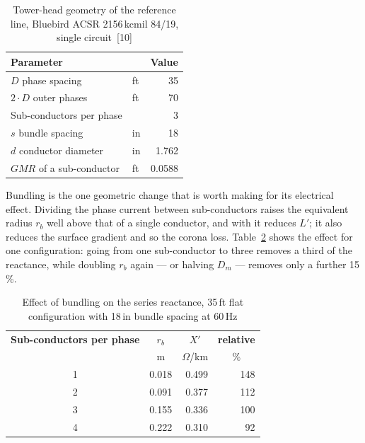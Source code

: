 \begin{table}[!ht]
  \centering
  \begin{tabular}{@{}l l r@{}}
    \toprule
    \textbf{Parameter} & & \multicolumn{1}{c}{\textbf{Value}} \\
    \midrule
    $D$ phase spacing & ft & 35 \\
    $2 \cdot D$ outer phases & ft & 70 \\
    Sub-conductors per phase & & 3 \\
    $s$ bundle spacing & in & 18 \\
    $d$ conductor diameter & in & 1.762 \\
    $GMR$ of a sub-conductor & ft & 0.0588 \\
    \bottomrule
  \end{tabular}
  \caption{Tower-head geometry of the reference line, Bluebird ACSR
           2156\,kcmil 84/19, single circuit~[10]}
  \label{tab:ohl-geometry}
\end{table}

Bundling is the one geometric change that is worth making for its electrical
effect. Dividing the phase current between sub-conductors raises the
equivalent radius $r_b$ well above that of a single conductor, and with it
reduces $L'$; it also reduces the surface gradient and so the corona loss.
Table~\ref{tab:ohl-bundle} shows the effect for one configuration: going
from one sub-conductor to three removes a third of the reactance, while
doubling $r_b$ again --- or halving $D_m$ --- removes only a further
15\,\%.

\begin{table}[!ht]
  \centering
  \begin{tabular}{@{}c r r r@{}}
    \toprule
    \textbf{Sub-conductors per phase} & \multicolumn{1}{c}{\textbf{$r_b$}}
      & \multicolumn{1}{c}{\textbf{$X'$}}
      & \multicolumn{1}{c}{\textbf{relative}} \\
    & \multicolumn{1}{c}{m} & \multicolumn{1}{c}{$\Omega$/km}
      & \multicolumn{1}{c}{\%} \\
    \midrule
    1 & 0.018 & 0.499 & 148 \\
    2 & 0.091 & 0.377 & 112 \\
    3 & 0.155 & 0.336 & 100 \\
    4 & 0.222 & 0.310 &  92 \\
    \bottomrule
  \end{tabular}
  \caption{Effect of bundling on the series reactance, 35\,ft flat
           configuration with 18\,in bundle spacing at 60\,Hz}
  \label{tab:ohl-bundle}
\end{table}

